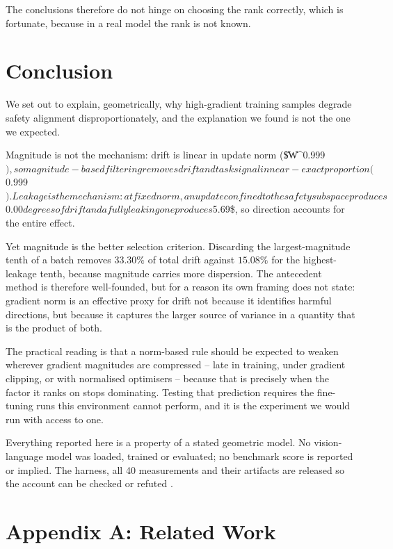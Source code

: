 \documentclass{article}
\begin{document}
The conclusions therefore do not hinge on choosing the rank correctly, which is fortunate, because in a real model the rank is not known.




\section{Conclusion}


We set out to explain, geometrically, why high-gradient training samples degrade safety alignment disproportionately, and the explanation we found is not the one we expected.

Magnitude is not the mechanism: drift is linear in update norm (\$\|\Delta W\|^{0.999}$), so magnitude-based filtering removes drift and task signal in near-exact proportion ($0.999\times$). Leakage is the mechanism: at fixed norm, an update confined to the safety subspace produces $0.00$ degrees of drift and a fully leaking one produces $5.69\$, so direction accounts for the entire effect.

Yet magnitude is the better selection criterion. Discarding the largest-magnitude tenth of a batch removes $33.30\%$ of total drift against $15.08\%$ for the highest-leakage tenth, because magnitude carries more dispersion. The antecedent method is therefore well-founded, but for a reason its own framing does not state: gradient norm is an effective proxy for drift not because it identifies harmful directions, but because it captures the larger source of variance in a quantity that is the product of both.

The practical reading is that a norm-based rule should be expected to weaken wherever gradient magnitudes are compressed -- late in training, under gradient clipping, or with normalised optimisers -- because that is precisely when the factor it ranks on stops dominating. Testing that prediction requires the fine-tuning runs this environment cannot perform, and it is the experiment we would run with access to one.

Everything reported here is a property of a stated geometric model. No vision-language model was loaded, trained or evaluated; no benchmark score is reported or implied. The harness, all 40 measurements and their artifacts are released so the account can be checked or refuted \cite{arxiv_2604_17215}.




\section{Appendix A: Related Work}
\end{document}
